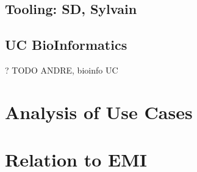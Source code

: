 \documentclass[3p,twocolumn]{article}
\begin{document}
 \subsection{Tooling: SD, Sylvain}


 \subsection{UC BioInformatics}

  ? TODO ANDRE, bioinfo UC


\section{Analysis of Use Cases}


\section{Relation to EMI}




\end{document}

